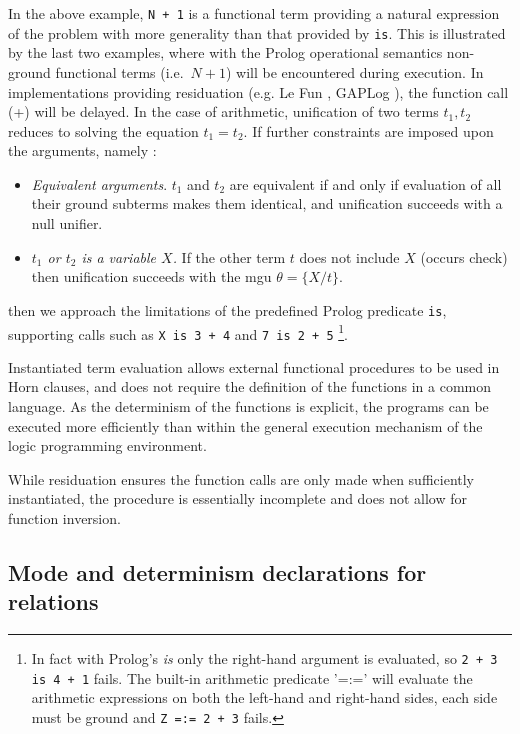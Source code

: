 In the above example, \texttt{N + 1} is a functional term providing a natural expression
of the problem with more generality than that provided by \texttt{is}.
This is illustrated by the last two examples, where with the Prolog operational semantics
non-ground functional terms (i.e.\ $N + 1$) will be encountered during execution.  In implementations
providing residuation (e.g. Le Fun \cite{AKLN87}, GAPLog \cite{MBB+93}),
the function call (+) will be delayed.  In the case of arithmetic, unification of 
two terms $t_1, t_2$ reduces to solving the equation $t_1 = t_2$. If further constraints are
imposed upon the arguments, namely \cite{MBB+93}:
\begin{itemize}
\item{\textit{Equivalent arguments}. $t_1$ and $t_2$ are equivalent if and only if evaluation of
  all their ground subterms makes them identical, and unification succeeds with a null unifier.}
\item{\textit{$t_1$ or $t_2$ is a variable $X$.}  If the other term $t$ does not include $X$ (occurs
  check) then unification succeeds with the mgu $\theta = \{X/t\}$.}
\end{itemize}
then we approach the limitations of the predefined Prolog predicate \texttt{is},
supporting calls such as
\texttt{X is 3 + 4} and \texttt{7 is 2 + 5}
\footnote{In fact with Prolog's \textit{is} 
  only the right-hand argument is evaluated, so \texttt{2 + 3 is 4 + 1} fails.
  The built-in arithmetic predicate '=:=' will evaluate the arithmetic 
  expressions on both the left-hand and right-hand sides, each side
  must be ground and \texttt{Z =:= 2 + 3} fails.}.

Instantiated term evaluation allows external functional procedures to be used in Horn clauses,
and does not require the definition of the functions in a common language.  As the determinism of
the functions is explicit, the programs can be executed more efficiently than within the
general execution mechanism of the logic programming environment.

While residuation
ensures the function calls are only made when sufficiently instantiated, the procedure is
essentially incomplete and does not allow for function inversion.

\subsection{Mode and determinism declarations for relations}
\label{modes}

